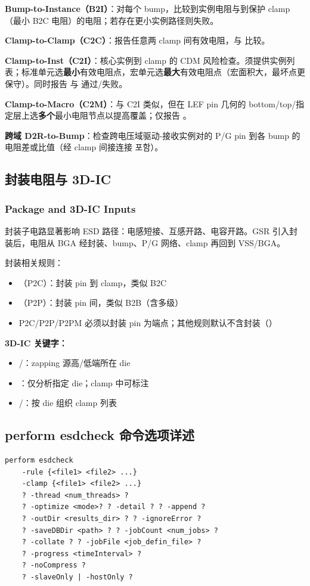 \textbf{Bump-to-Instance（B2I）}：对每个 bump，比较到实例电阻与到保护 clamp（最小 B2C 电阻）的电阻；若存在更小实例路径则失败。

\textbf{Clamp-to-Clamp（C2C）}：报告任意两 clamp 间有效电阻，与  比较。

\textbf{Clamp-to-Inst（C2I）}：核心实例到 clamp 的 CDM 风险检查。须提供实例列表；标准单元选\textbf{最小}有效电阻点，宏单元选\textbf{最大}有效电阻点（宏面积大，最坏点更保守）。同时报告  与  通过/失败。

\textbf{Clamp-to-Macro（C2M）}：与 C2I 类似，但在 LEF pin 几何的 bottom/top/指定层上选\textbf{多个}最小电阻节点以提高覆盖；仅报告 。

\textbf{跨域 D2R-to-Bump}：检查跨电压域驱动-接收实例对的 P/G pin 到各 bump 的电阻差或比值（经 clamp 间接连接 포함）。

\subsection{封装电阻与 3D-IC}
\subsubsection*{Package and 3D-IC Inputs}

封装子电路显著影响 ESD 路径：电感短接、互感开路、电容开路。GSR  引入封装后，电阻从 BGA 经封装、bump、P/G 网络、clamp 再回到 VSS/BGA。

封装相关规则：
\begin{itemize}
  \item {}（P2C）：封装 pin 到 clamp，类似 B2C
  \item {}（P2P）：封装 pin 间，类似 B2B（含多级）
  \item P2C/P2P/P2PM 必须以封装 pin 为端点；其他规则默认不含封装（）
\end{itemize}

\textbf{3D-IC 关键字：}
\begin{itemize}
  \item {}/：zapping 源高/低端所在 die
  \item {}：仅分析指定 die；clamp 中可标注 
  \item {}/：按 die 组织 clamp 列表
\end{itemize}

\subsection{perform esdcheck 命令选项详述}
\begin{lstlisting}
perform esdcheck
    -rule {<file1> <file2> ...}
    -clamp {<file1> <file2> ...}
    ? -thread <num_threads> ?
    ? -optimize <mode>? ? -detail ? ? -append ?
    ? -outDir <results_dir> ? ? -ignoreError ?
    ? -saveDBDir <path> ? ? -jobCount <num_jobs> ?
    ? -collate ? ? -jobFile <job_defin_file> ?
    ? -progress <timeInterval> ?
    ? -noCompress ?
    ? -slaveOnly | -hostOnly ?
\end{lstlisting}

